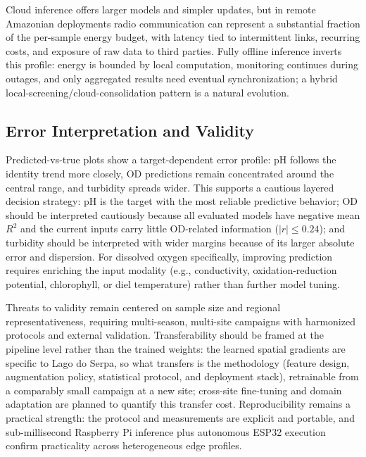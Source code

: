 Cloud inference offers larger models and simpler updates, but in remote Amazonian deployments radio communication can represent a substantial fraction of the per-sample energy budget, with latency tied to intermittent links, recurring costs, and exposure of raw data to third parties. Fully offline inference inverts this profile: energy is bounded by local computation, monitoring continues during outages, and only aggregated results need eventual synchronization; a hybrid local-screening/cloud-consolidation pattern is a natural evolution.

\subsection{Error Interpretation and Validity}
Predicted-vs-true plots show a target-dependent error profile: pH follows the identity trend more closely, OD predictions remain concentrated around the central range, and turbidity spreads wider. This supports a cautious layered decision strategy: pH is the target with the most reliable predictive behavior; OD should be interpreted cautiously because all evaluated models have negative mean $R^2$ and the current inputs carry little OD-related information ($|r| \leq 0.24$); and turbidity should be interpreted with wider margins because of its larger absolute error and dispersion. For dissolved oxygen specifically, improving prediction requires enriching the input modality (e.g., conductivity, oxidation-reduction potential, chlorophyll, or diel temperature) rather than further model tuning.

Threats to validity remain centered on sample size and regional representativeness, requiring multi-season, multi-site campaigns with harmonized protocols and external validation. Transferability should be framed at the pipeline level rather than the trained weights: the learned spatial gradients are specific to Lago do Serpa, so what transfers is the methodology (feature design, augmentation policy, statistical protocol, and deployment stack), retrainable from a comparably small campaign at a new site; cross-site fine-tuning and domain adaptation are planned to quantify this transfer cost. Reproducibility remains a practical strength: the protocol and measurements are explicit and portable, and sub-millisecond Raspberry Pi inference plus autonomous ESP32 execution confirm practicality across heterogeneous edge profiles.
